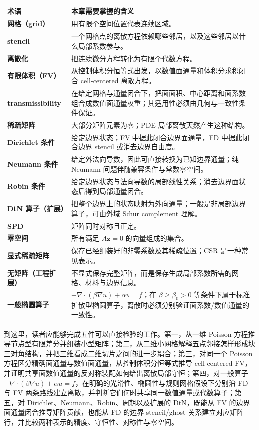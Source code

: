 \begin{center}
\begin{tabularx}{0.94\textwidth}{>{\bfseries}p{3.0cm}X}
\toprule
术语 & 本章需要掌握的含义\\
\midrule
网格（grid） & 用有限个空间位置代表连续区域。\\
stencil & 一个网格点的离散方程依赖哪些邻居，以及这些邻居以什么局部系数参与。\\
离散化 & 把连续微分方程转化为有限个代数方程。\\
有限体积（FV） & 从控制体积分恒等式出发，以数值面通量和体积分求积闭合 cell-centered 离散方程。\\
transmissibility & 在给定网格与通量闭合下，把面面积、中心距离和面系数组合成数值面通量权重；其适用性必须由几何与一致性条件保证。\\
稀疏矩阵 & 大部分矩阵元素为零；PDE 局部离散天然产生这种结构。\\
Dirichlet 条件 & 给定边界状态；FV 中据此闭合边界面通量，FD 中据此闭合边界 stencil 或消去边界自由度。\\
Neumann 条件 & 给定外法向导数，因此可直接转换为已知边界通量；纯 Neumann 问题伴随兼容条件与常数零空间。\\
Robin 条件 & 给定边界状态与法向导数的局部线性关系；消去边界面状态后得到局部通量闭合。\\
DtN 算子（扩展） & 把整个边界上的状态映射为外向通量；一般是非局部边界算子，可由外域 Schur complement 理解。\\
SPD & 矩阵同时对称且正定。\\
零空间 & 所有满足 $A\bm z=0$ 的向量组成的集合。\\
显式稀疏矩阵 & 保存已经组装好的非零系数及其稀疏位置；CSR 是一种常见表示。\\
无矩阵（工程扩展） & 不显式保存完整矩阵，而是保存生成局部系数所需的网格、材料与边界信息。\\
一般椭圆算子 & $-\nabla\cdot(\beta\nabla u)+\alpha u=f$；在 $\beta\ge\beta_0>0$ 等条件下属于标准扩散型椭圆算子，离散时必须分别验证面系数/数值通量的一致性。\\
\bottomrule
\end{tabularx}
\end{center}

到这里，读者应能够完成五件可以直接检验的工作。第一，从一维 Poisson 方程推导节点型有限差分并组装小型矩阵；第二，从二维小网格解释五点邻接怎样形成块三对角结构，并把三维看成二维切片之间的进一步耦合；第三，对同一个 Poisson 方程区分精确面通量与数值面通量，从控制体积分恒等式推导 cell-centered FV，并证明共享面数值通量的反对称装配如何给出离散局部守恒；第四，对一般算子 $-\nabla\cdot(\beta\nabla u)+\alpha u=f$，在明确的光滑性、椭圆性与规则网格假设下分别沿 FD 与 FV 两条路线建立离散，并判断它们何时共享同一数值通量或代数算子；第五，对 Dirichlet、Neumann、Robin、周期以及扩展的 DtN，既能从 FV 的边界面通量闭合推导矩阵贡献，也能从 FD 的边界 stencil/ghost 关系建立对应矩阵行，并比较两种表示的精度、守恒性、对称性与零空间。

